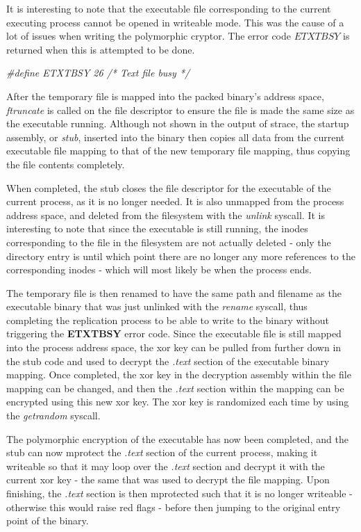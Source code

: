 \documentclass[a4paper, 11pt]{article} %
\begin{document}
It is interesting to note that the executable file corresponding to the current executing process cannot be opened in writeable mode. This was the cause of a lot of issues when writing the polymorphic cryptor. The error code $ETXTBSY$ is returned when this is attempted to be done. 

\hfill\break
\centerline{\textit{\#define ETXTBSY         26      /* Text file busy */ }}
\hfill

After the temporary file is mapped into the packed binary's address space, \textit{ftruncate} is called on the file descriptor to ensure the file is made the same size as the executable running. Although not shown in the output of strace, the startup assembly, or \textit{stub}, inserted into the binary then copies all data from the current executable file mapping to that of the new temporary file mapping, thus copying the file contents completely.

When completed, the stub closes the file descriptor for the executable of the current process, as it is no longer needed. It is also unmapped from the process address space, and deleted from the filesystem with the \textit{unlink} syscall. It is interesting to note that since the executable is still running, the inodes corresponding to the file in the filesystem are not actually deleted - only the directory entry is until which point there are no longer any more references to the corresponding inodes - which will most likely be when the process ends.

The temporary file is then renamed to have the same path and filename as the executable binary that was just unlinked with the \textit{rename} syscall, thus completing the replication process to be able to write to the binary without triggering the \textbf{ETXTBSY} error code. Since the executable file is still mapped into the process address space, the xor key can be pulled from further down in the stub code and used to decrypt the \textit{.text} section of the executable binary mapping. Once completed, the xor key in the decryption assembly within the file mapping can be changed, and then the \textit{.text} section within the mapping can be encrypted using this new xor key. The xor key is randomized each time by using the \textit{getrandom} syscall.

The polymorphic encryption of the executable has now been completed, and the stub can now mprotect the \textit{.text} section of the current process, making it writeable so that it may loop over the \textit{.text }section and decrypt it with the current xor key - the same that was used to decrypt the file mapping. Upon finishing, the \textit{.text} section is then mprotected such that it is no longer writeable - otherwise this would raise red flags - before then jumping to the original entry point of the binary.
\end{document}
